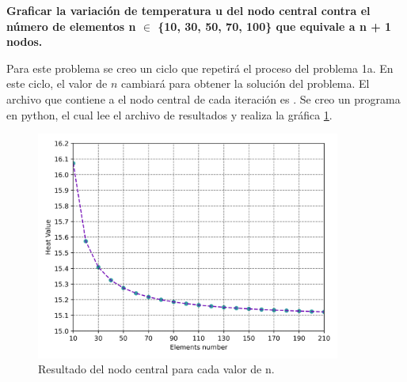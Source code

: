 \textbf{Graficar la variación de temperatura u del nodo central contra el número de elementos n $\in$ \{10, 30, 50, 70, 100\} que equivale a n + 1 nodos.}

Para este problema se creo un ciclo que repetirá el proceso del problema 1a. En este ciclo, el valor de $n$ cambiará para obtener la solución del problema. El archivo que contiene a el nodo central de cada iteración es . Se creo un programa en python, el cual lee el archivo de resultados y realiza la gráfica \ref{fig:heat_results}.

\begin{figure}[H]
    \centering
    \includegraphics[width=10cm]{Graphics/heat_results.png}
    \caption{Resultado del nodo central para cada valor de n.}
    \label{fig:heat_results}
\end{figure}